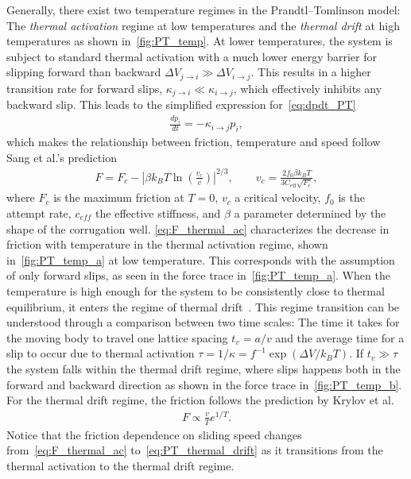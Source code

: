 Generally, there exist two temperature regimes in the Prandtl–Tomlinson model: The \textit{thermal activation} regime at low temperatures and the \textit{thermal drift} at high temperatures as shown in~\cref{fig:PT_temp}. At lower temperatures, the system is subject to standard thermal activation with a much lower energy barrier for slipping forward than backward $\Delta V_{j \to i} \gg \Delta V_{i \to j}$. This results in a higher transition rate for forward slips, $\kappa_{j \to i} \ll \kappa_{i \to j}$, which effectively inhibits any backward slip. This leads to the simplified expression for~\cref{eq:dpdt_PT}
\begin{align*}
  \frac{dp_i}{dt} = -\kappa_{i\to j}p_i,
\end{align*}
which makes the relationship between friction, temperature and speed follow Sang et al.’s prediction~\cite{Sang_2001}
\begin{align}
  F=F_c-\left|\beta k_B T \ln \left(\frac{v_c}{v}\right)\right|^{2 / 3}, \qquad v_c = \frac{2f_0\beta k_B T}{3 C_{\text{eff}} \sqrt{F_c}},
  \label{eq:F_thermal_ac}
\end{align}
where $F_c$ is the maximum friction at $T = 0$, $v_c$ a critical velocity, $f_0$
is the attempt rate, $c_{eff}$ the effective stiffness, and $\beta$ a
parameter determined by the shape of the corrugation well. \cref{eq:F_thermal_ac} characterizes the decrease in friction with temperature
in the thermal activation regime, shown in~\cref{fig:PT_temp_a} at low temperature. This corresponds with the assumption of only forward slips, as seen in the force trace in~\cref{fig:PT_temp_a}. When the temperature is high enough for the system to be consistently close to thermal equilibrium, it enters the regime of thermal drift~\cite{PhysRevE.71.065101}. This regime transition can be understood through a comparison between two time scales: The time it takes for the moving body to travel one lattice spacing
$t_v = a/v$ and the average time for a slip to occur due to thermal activation
$\tau = 1/\kappa = f^{-1}\exp(\Delta V / k_BT)$. If $t_v \gg \tau$ the system falls within the thermal drift regime, where slips happens both in the forward and backward direction as shown in the force trace in~\cref{fig:PT_temp_b}. For the thermal drift regime, the friction follows the prediction by Krylov et
al.~\cite{Krylow_2007, PhysRevE.71.065101, Jinesh_2008}
\begin{align}
  F \propto \frac{v}{T}e^{1/T}.
  \label{eq:PT_thermal_drift}
\end{align}
Notice that the friction dependence on sliding speed changes from~\cref{eq:F_thermal_ac} to~\cref{eq:PT_thermal_drift} as it transitions from the thermal activation to the thermal drift regime. 


